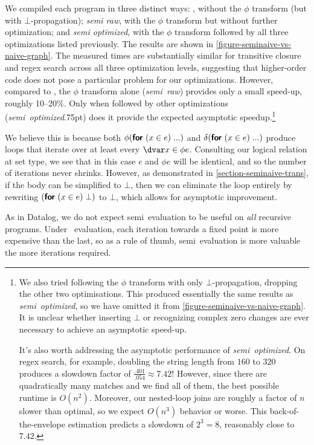 
\clearpage
\noindent
\XXX
We compiled each program in three distinct ways: \emph{\naive{}}, without the
$\phi$ transform (but with $\bot$-propagation); \emph{semi\naive{} raw}, with
the $\phi$ transform but without further optimization; and \emph{semi\naive{}
  optimized}, with the $\phi$ transform followed by all three optimizations
listed previously. The results are shown in
\cref{figure-seminaive-vs-naive-graph}.
%
The measured times are substantially similar for transitive closure and regex
search across all three optimization levels, suggesting that higher-order code
does not pose a particular problem for our optimizations. However, compared to
\emph{\naive}, the $\phi$ transform alone (\emph{semi\naive\ raw}) provides only
a small speed-up, roughly 10--20\%. Only when followed by other optimizations
(\emph{semi\naive\ optimized}\kern.75pt) does it provide the expected asymptotic
speedup.\footnote{We also tried following the $\phi$ transform with only
  $\bot$-propagation, dropping the other two optimisations. This produced
  essentially the same results as \emph{semi\naive\ optimized}, so we have
  omitted it from \cref{figure-seminaive-vs-naive-graph}. It is unclear whether
  inserting $\bot$ or recognizing complex zero changes are ever necessary to
  achieve an asymptotic speed-up.

  It's also worth addressing the asymptotic performance of
  \emph{semi\naive\ optimized}. On regex search, for example, doubling the string
  length from $160$ to $320$ produces a slowdown factor of $\frac{.401}{.054}
  \approx 7.42$! However, since there are quadratically many matches and we find
  all of them, the best possible runtime is $O(n^2)$. Moreover, our nested-loop
  joins are roughly a factor of $n$ slower than optimal, so we expect $O(n^3)$
  behavior or worse. This back-of-the-envelope estimation predicts a slowdown of
  $2^3 = 8$, reasonably close to $7.42$.}

We believe this is because both $\phi(\textsf{\bfseries for}_{}\;({{x} \in e})\; ...)$ and $\delta(\textsf{\bfseries for}_{}\;({{x} \in e})\;
...)$ produce loops that iterate over at least every $\dvar x \in \phi e$.
Consulting our logical relation at set type, we see that in this case $e$ and
$\phi e$ will be identical, and so the number of iterations never shrinks.
However, as demonstrated in \cref{section-seminaive-trans}, if the body can be
simplified to $\bot$, then we can eliminate the loop entirely by rewriting
$(\textsf{\bfseries for}_{}\;({{x} \in e})\; \bot)$ to $\bot$, which allows for asymptotic improvement.

As in Datalog, we do not expect semi\naive\ evaluation to be useful on
\emph{all} recursive programs. Under \naive\ evaluation, each iteration towards
a fixed point is more expensive than the last, so as a rule of thumb,
semi\naive\ evaluation is more valuable the more iterations required.

